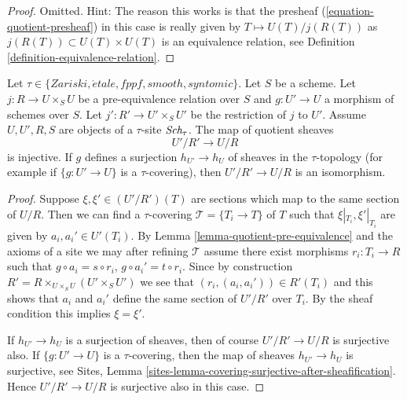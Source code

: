 \begin{proof}
Omitted. Hint: The reason this works is that the presheaf
(\ref{equation-quotient-presheaf}) in this case is really given
by $T \mapsto U(T)/j(R(T))$ as $j(R(T)) \subset U(T) \times U(T)$
is an equivalence relation, see
Definition \ref{definition-equivalence-relation}.
\end{proof}

\begin{lemma}
\label{lemma-quotient-pre-equivalence-relation-restrict}
Let $\tau \in \{Zariski, \acute{e}tale, fppf, smooth, syntomic\}$.
Let $S$ be a scheme.
Let $j : R \to U \times_S U$ be a pre-equivalence relation over $S$
and $g : U' \to U$ a morphism of schemes over $S$.
Let $j' : R' \to U' \times_S U'$ be the restriction of $j$ to $U'$.
Assume  $U, U', R, S$ are objects of a $\tau$-site $\textit{Sch}_\tau$.
The map of quotient sheaves
$$
U'/R' \longrightarrow U/R
$$
is injective. If $g$ defines a surjection $h_{U'} \to h_U$ of sheaves
in the $\tau$-topology (for example if $\{g : U' \to U\}$ is a
$\tau$-covering), then $U'/R' \to U/R$ is an isomorphism.
\end{lemma}

\begin{proof}
Suppose $\xi, \xi' \in (U'/R')(T)$ are sections which
map to the same section of $U/R$.
Then we can find a $\tau$-covering $\mathcal{T} = \{T_i \to T\}$ of $T$
such that $\xi|_{T_i}, \xi'|_{T_i}$ are given by $a_i, a_i' \in U'(T_i)$. By
Lemma \ref{lemma-quotient-pre-equivalence}
and the axioms of a site we may after refining
$\mathcal{T}$ assume there exist morphisms $r_i : T_i \to R$
such that $g \circ a_i = s \circ r_i$, $g \circ a_i' = t \circ r_i$.
Since by construction
$R' = R \times_{U \times_S U} (U' \times_S U')$
we see that $(r_i, (a_i, a_i')) \in R'(T_i)$ and this
shows that $a_i$ and $a_i'$ define the same section
of $U'/R'$ over $T_i$. By the sheaf condition this implies
$\xi = \xi'$.

\medskip\noindent
If $h_{U'} \to h_U$ is a surjection
of sheaves, then of course $U'/R' \to U/R$ is surjective also.
If $\{g : U' \to U\}$ is a $\tau$-covering, then
the map of sheaves $h_{U'} \to h_U$ is surjective, see
Sites, Lemma \ref{sites-lemma-covering-surjective-after-sheafification}.
Hence $U'/R' \to U/R$ is surjective also in this case.
\end{proof}

